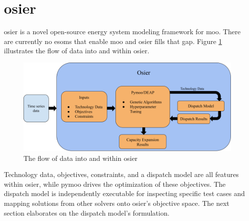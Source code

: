 \section{\acl{osier}}

\acf{osier} is a novel open-source energy system modeling framework
for \acl{moo}. There are currently no \acp{esom} that enable
\ac{moo} and \ac{osier} fills that gap. Figure \ref{fig:osier_flow} 
illustrates the flow of data into and within \ac{osier}.

\begin{figure}[H]
    \centering
    \includegraphics[width=\columnwidth]{figures/osier_flow}
    \caption{The flow of data into and within \ac{osier}}
    \label{fig:osier_flow}
\end{figure}

 Technology data, 
objectives, constraints, and a dispatch model are all features within \ac{osier}, while \ac{pymoo} drives the optimization of these objectives. The dispatch model is independently executable for inspecting specific test cases and mapping solutions from other solvers onto \ac{osier}'s objective space. The next section
elaborates on the dispatch model's formulation.
